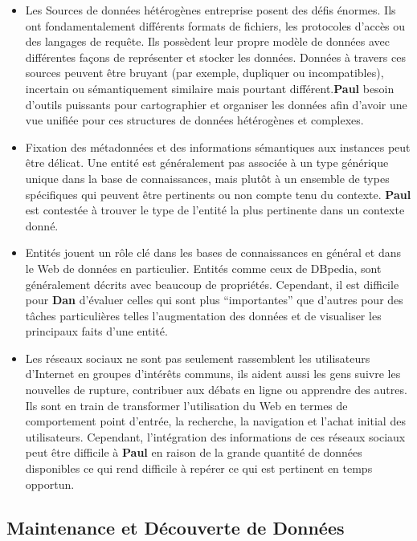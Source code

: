 \documentclass[a4paper,11pt,twoside]{ThesisStyle}
\begin{document}
\begin{itemize}
	\item Les Sources de données hétérogènes entreprise posent des défis énormes. Ils ont fondamentalement différents formats de fichiers, les protocoles d'accès ou des langages de requête. Ils possèdent leur propre modèle de données avec différentes façons de représenter et stocker les données. Données à travers ces sources peuvent être bruyant (par exemple, dupliquer ou incompatibles), incertain ou sémantiquement similaire mais pourtant différent.\textbf{Paul} besoin d'outils puissants pour cartographier et organiser les données afin d'avoir une vue unifiée pour ces structures de données hétérogènes et complexes.
	\item Fixation des métadonnées et des informations sémantiques aux instances peut être délicat. Une entité est généralement pas associée à un type générique unique dans la base de connaissances, mais plutôt à un ensemble de types spécifiques qui peuvent être pertinents ou non compte tenu du contexte. \textbf{Paul} est contestée à trouver le type de l'entité la plus pertinente dans un contexte donné.
	\item Entités jouent un rôle clé dans les bases de connaissances en général et dans le Web de données en particulier. Entités comme ceux de DBpedia, sont généralement décrits avec beaucoup de propriétés. Cependant, il est difficile pour \textbf{Dan} d'évaluer celles qui sont plus  ``importantes'' que d'autres pour des tâches particulières telles l'augmentation des données et de visualiser les principaux faits d'une entité.
	\item Les réseaux sociaux ne sont pas seulement rassemblent les utilisateurs d'Internet en groupes d'intérêts communs, ils aident aussi les gens suivre les nouvelles de rupture, contribuer aux débats en ligne ou apprendre des autres. Ils sont en train de transformer l'utilisation du Web en termes de comportement point d'entrée, la recherche, la navigation et l'achat initial des utilisateurs. Cependant, l'intégration des informations de ces réseaux sociaux peut être difficile à \textbf{Paul} en raison de la grande quantité de données disponibles ce qui rend difficile à repérer ce qui est pertinent en temps opportun.
\end{itemize}

\subsection{Maintenance et Découverte de Données}
\end{document}
